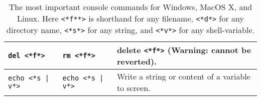 \documentclass[springer.tex]{subfiles}
\begin{document}
\begin{table}
\begin{tabularx}{\linewidth}{|l|l|>{\raggedright\arraybackslash}X|}
    {\lstinline[language=syntax]!del <*f*>!}
            & {\lstinline[language=syntax]!rm <*f*>!}
                          & delete {\lstinline[language=syntax]!<*f*>!} (Warning: cannot be reverted). \\ \hline
    {\lstinline[language=syntax, keywords={}]!echo <*s | v*>!\hspace*{5mm}}
            & {\lstinline[language=syntax, keywords={}]!echo <*s | v*>!\hspace*{5mm}}
                          & Write a string or content of a variable to screen. \\ \hline
  \end{tabularx}\\
  \caption{The most important console commands for Windows, MacOS X,
    and Linux. Here \lstinline[language=syntax]{<*f**>} is shorthand for any filename,
  \lstinline[language=syntax]{<*d*>} for any directory name,
\lstinline[language=syntax]{<*s*>} for any string, and
\lstinline[language=syntax]{<*v*>} for any shell-variable.}
  \label{tab:Kommandoer}
\end{table}
\end{document}
